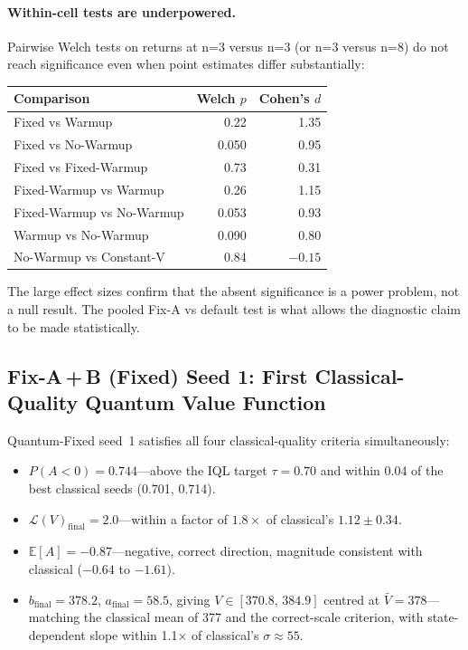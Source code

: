 \documentclass[10pt,a4paper]{article}
\begin{document}
\paragraph{Within-cell tests are underpowered.}
Pairwise Welch tests on returns at n=3 versus n=3 (or n=3 versus n=8) do not
reach significance even when point estimates differ substantially:

\begin{center}
\setlength{\tabcolsep}{8pt}
\begin{tabular}{lrr}
\toprule
Comparison & Welch $p$ & Cohen's $d$ \\
\midrule
Fixed vs Warmup                     & 0.22  & 1.35 \\
Fixed vs No-Warmup                  & 0.050 & 0.95 \\
Fixed vs Fixed-Warmup               & 0.73  & 0.31 \\
Fixed-Warmup vs Warmup              & 0.26  & 1.15 \\
Fixed-Warmup vs No-Warmup           & 0.053 & 0.93 \\
Warmup vs No-Warmup                 & 0.090 & 0.80 \\
No-Warmup vs Constant-V             & 0.84  & $-0.15$ \\
\bottomrule
\end{tabular}
\end{center}

The large effect sizes confirm that the absent significance is a power
problem, not a null result. The pooled Fix-A vs default test is what allows
the diagnostic claim to be made statistically.

\subsection{Fix-A\,+\,B (Fixed) Seed 1: First Classical-Quality Quantum
            Value Function}

Quantum-Fixed seed~1 satisfies all four classical-quality criteria
simultaneously:
\begin{itemize}
  \item $P(A{<}0) = 0.744$---above the IQL target $\tau=0.70$ and within
        0.04 of the best classical seeds (0.701, 0.714).
  \item $\mathcal{L}(V)_\text{final} = 2.0$---within a factor of $1.8\times$
        of classical's $1.12\pm0.34$.
  \item $\mathbb{E}[A] = -0.87$---negative, correct direction, magnitude
        consistent with classical ($-0.64$ to $-1.61$).
  \item $b_\text{final}=378.2$, $a_\text{final}=58.5$, giving
        $V\in[370.8,\,384.9]$ centred at $\bar V=378$---matching the
        classical mean of 377 and the correct-scale criterion, with
        state-dependent slope within 1.1$\times$ of classical's
        $\sigma\approx55$.
\end{itemize}
\end{document}
